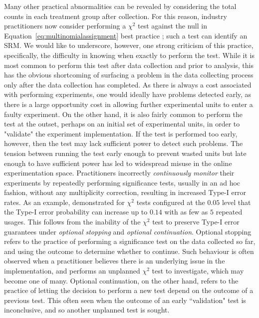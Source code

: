 \documentclass[11pt]{article}
\begin{document}
Many other practical abnormalities can be revealed by considering the total counts in each treatment group after collection.
For this reason, industry practitioners now consider performing a $\chi^2$ test against the null in Equation~\ref{eq:multinomialassignment} best practice \citep{linkedin}; such a test can identify an SRM.
We would like to underscore, however, one strong criticism of this practice,
specifically,
the difficulty in knowing when exactly to perform the test.
While it is most common to perform this test after data collection and prior to analysis,
this has the obvious shortcoming of surfacing a problem in the data collecting process only after the data collection has completed.
As there is always a cost associated with performing experiments, one would ideally have problems detected early, as there is a large opportunity cost in allowing further experimental units to enter a faulty experiment.
On the other hand, it is also fairly common to perform the test at the outset, perhaps on an initial set of experimental units, in order to "validate" the experiment implementation.
If the test is performed too early, however, then the test may lack sufficient power to detect such problems.
The tension between running the test early enough to prevent wasted units but late enough to have sufficient power has led to widespread misuse in the online experimentation space.
Practitioners incorrectly \textit{continuously monitor} their experiments by repeatedly performing significance tests, usually in an ad hoc fashion, without any multiplicity correction, resulting in increased Type-I error rates.
As an example, \cite{armitage} demonstrated for $\chi^2$ tests configured at the $0.05$ level that the Type-I error probability can increase up to $0.14$ with as few as $5$ repeated usages.
This follows from the inability of the $\chi^2$ test to preserve Type-I error guarantees under \textit{optional stopping} and \textit{optional continuation}.
Optional stopping refers to the practice of performing a significance test on the data collected so far, and using the outcome to determine whether to continue.
Such behaviour is often observed when a practitioner believes there is an underlying issue in the implementation, and performs an unplanned $\chi^2$ test to investigate,
which may become one of many.
Optional continuation, on the other hand, refers to the practice of letting the decision to perform a new test depend on the outcome of a previous test.
This often seen when the outcome of an early ``validation" test is inconclusive, and so another unplanned test is sought.
\end{document}
